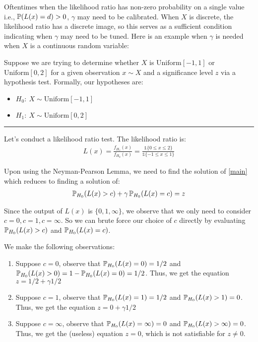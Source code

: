 \documentclass{article}
\begin{document}
Oftentimes when the likelihood ratio has non-zero probability on a single value i.e., $\operatorname{\mathbb{P}}(L(x) = d) > 0$, $\gamma$ may need to be calibrated. When $X$ is discrete, the likelihood ratio has a discrete image, so this serves as a sufficient condition indicating when $\gamma$ may need to be tuned. Here is an example when $\gamma$ is needed when $X$ is a continuous random variable:

\newpage
\begin{example}
Suppose we are trying to determine whether $X$ is $\text{Uniform}[-1, 1]$ or $\text{Uniform}[0, 2]$ for a given observation $x \sim X$ and a significance level $z$ via a hypothesis test. Formally, our hypotheses are:
\begin{itemize}
    \item $H_0:\ X \sim \text{Uniform}[-1, 1]$
    \item $H_1:\ X \sim \text{Uniform}[0, 2]$
\end{itemize}
\noindent\rule{4cm}{0.4pt}

Let's conduct a likelihood ratio test. The likelihood ratio is:
\begin{align*}
L(x) = \frac{f_{H_1}(x)}{f_{H_0}(x)} = \frac{\mathds{1}\{0 \leq x \leq 2\}}{\mathds{1}\{-1 \leq x \leq 1\}}
\end{align*}

Upon using the Neyman-Pearson Lemma, we need to find the solution of \eqref{main} which reduces to finding a solution of:
\begin{align*}
\operatorname{\mathbb{P}}_{H_0}(L(x) > c) + \gamma \operatorname{\mathbb{P}}_{H_0}(L(x) = c) = z
\end{align*}

Since the output of $L(x)$ is $\{0, 1, \infty\}$, we observe that we only need to consider $c= 0, c = 1, c= \infty$. So we can brute force our choice of $c$ directly by evaluating $\operatorname{\mathbb{P}}_{H_0}(L(x) > c) $ and $\operatorname{\mathbb{P}}_{H_0}(L(x) = c)$. 

We make the following observations:
\begin{enumerate}
    \item Suppose $c = 0$, observe that $\operatorname{\mathbb{P}}_{H_0}(L(x) = 0 ) = 1/2$ and $\operatorname{\mathbb{P}}_{H_0}(L(x) > 0) = 1- \operatorname{\mathbb{P}}_{H_0}(L(x) = 0 ) = 1/2$. Thus, we get the equation $z = 1/2 + \gamma 1/2$
    \item Suppose $c = 1$, observe that $\operatorname{\mathbb{P}}_{H_0}(L(x) = 1 ) = 1/2$ and $\operatorname{\mathbb{P}}_{H_0}(L(x) > 1) = 0$. Thus, we get the equation $z =  0 + \gamma 1/2$
    \item Suppose $c = \infty$, observe that $\operatorname{\mathbb{P}}_{H_0}(L(x) = \infty ) = 0$ and $\operatorname{\mathbb{P}}_{H_0}(L(x) > \infty) = 0$. Thus, we get the (useless) equation $z = 0$, which is not satisfiable for $z \neq 0$.
\end{enumerate}


\end{example}
\end{document}
